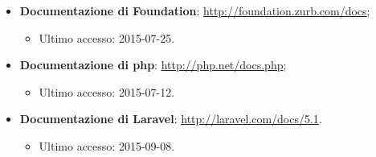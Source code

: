 \begin{itemize}
\begin{itemize}
\begin{itemize}
					\end{itemize}
					\item \textbf{Documentazione di Foundation}: \url{http://foundation.zurb.com/docs};
					\begin{itemize}
						\item Ultimo accesso: 2015-07-25.
					\end{itemize}
 					\item \textbf{Documentazione di \gls{php}}: \url{http://php.net/docs.php};
 					\begin{itemize}
 						\item Ultimo accesso: 2015-07-12.
 					\end{itemize}
 					\item \textbf{Documentazione di \gls{Laravel}}: \url{http://laravel.com/docs/5.1}.
 					\begin{itemize}
 						\item Ultimo accesso: 2015-09-08.
 					\end{itemize}
				\end{itemize}

	\end{itemize}
